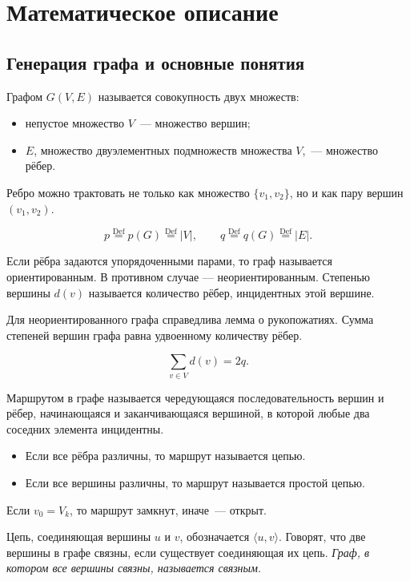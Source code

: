 \section{Математическое описание}

\subsection{Генерация графа и основные понятия}

Графом $G(V, E)$ называется совокупность двух множеств:
\begin{itemize}
    \item непустое множество $V$~--- множество вершин;
    \item $E$, множество двуэлементных подмножеств множества $V$,~--- множество рёбер.
\end{itemize}

Ребро можно трактовать не только как множество ${\{v_1, v_2\}}$, но и как пару вершин $(v_1, v_2)$.

\[
p \stackrel{\text{Def}}{=} p(G) \stackrel{\text{Def}}{=} |V|, \hspace{2em}
q \stackrel{\text{Def}}{=} q(G) \stackrel{\text{Def}}{=} |E|.
\]

Если рёбра задаются упорядоченными парами, то граф называется ориентированным. В противном случае --- неориентированным. Степенью вершины $d(v)$ называется количество рёбер, инцидентных этой вершине.

Для неориентированного графа справедлива лемма о рукопожатиях. Сумма степеней вершин графа равна удвоенному количеству рёбер.

\[
\sum_{v \in V} d(v) = 2q.
\]

Маршрутом в графе называется чередующаяся последовательность вершин и рёбер, начинающаяся и заканчивающаяся вершиной, в которой любые два соседних элемента инцидентны.

\begin{itemize}
    \item Если все рёбра различны, то маршрут называется цепью.
    \item Если все вершины различны, то маршрут называется простой цепью.
\end{itemize}

Если $v_0 = V_k$, то маршрут замкнут, иначе~--- открыт.

\vspace{1em}

Цепь, соединяющая вершины $u$ и $v$, обозначается $\langle u, v\rangle$. Говорят, что две вершины в графе связны, если существует соединяющая их цепь. \textit{Граф, в котором все вершины связны, называется связным}.

